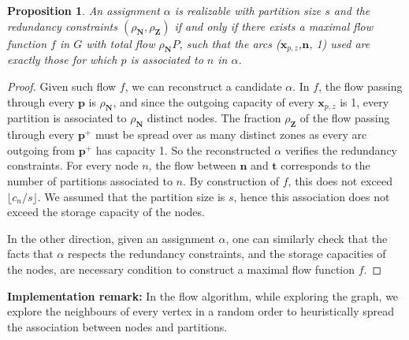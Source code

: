 \documentclass[]{article}
\newtheorem{proposition}{Proposition}
\begin{document}
\begin{proposition}
	An assignment $\alpha$ is realizable with partition size $s$ and the redundancy constraints $(\rho_\mathbf{N},\rho_\mathbf{Z})$ if and only if there exists a maximal flow function $f$ in $G$ with total flow $\rho_\mathbf{N}P$, such that the arcs ($\mathbf{x}_{p,z}$,$\mathbf{n}$, 1) used are exactly those for which $p$ is associated to $n$ in $\alpha$.
\end{proposition}
\begin{proof}
	Given such flow $f$, we can reconstruct a candidate $\alpha$. In $f$, the flow passing through every $\mathbf{p}$ is $\rho_\mathbf{N}$, and since the outgoing capacity of every $\mathbf{x}_{p,z}$ is 1, every partition is associated to $\rho_\mathbf{N}$ distinct nodes. The fraction $\rho_\mathbf{Z}$ of the flow passing through every $\mathbf{p^+}$ must be spread over as many distinct zones as every arc outgoing from $\mathbf{p^+}$ has capacity 1. So the reconstructed $\alpha$ verifies the redundancy constraints. For every node $n$, the flow between $\mathbf{n}$ and $\mathbf{t}$ corresponds to the number of partitions associated to $n$. By construction of $f$, this does not exceed $\lfloor c_n/s \rfloor$. We assumed that the partition size is $s$, hence this association does not exceed the storage capacity of the nodes.
	
	In the other direction, given an assignment $\alpha$, one can similarly check that the facts that $\alpha$ respects the redundancy constraints, and the storage capacities of the nodes, are necessary condition to construct a maximal flow function $f$.
\end{proof}

\textbf{Implementation remark:} In the flow algorithm, while exploring the graph, we explore the neighbours of every vertex in a random order to heuristically spread the association between nodes and partitions.
\end{document}
